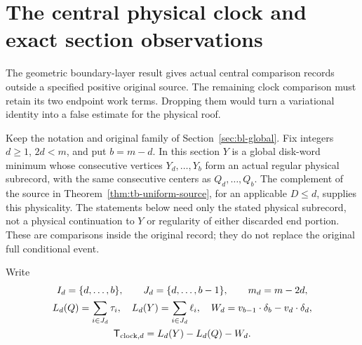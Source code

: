 \section{The central physical clock and exact section observations}
\label{sec:cp-central}
The geometric boundary-layer result gives actual central comparison
records outside a specified positive original source.  The remaining
clock comparison must retain its two endpoint work terms.  Dropping
them would turn a variational identity into a false estimate for the
physical roof.

Keep the notation and original family of Section~\ref{sec:bl-global}.
Fix integers $d\ge1$, $2d<m$, and put $b=m-d$.  In this section
$Y$ is a global disk-word minimum whose consecutive vertices
$Y_d,\ldots,Y_b$ form an actual regular physical subrecord, with the
same consecutive centers as $Q_d,\ldots,Q_b$.  The complement of the
source in Theorem~\ref{thm:tb-uniform-source}, for an applicable
$D\le d$, supplies this physicality.  The statements below need only
the stated physical subrecord, not a physical continuation to $Y$ or
regularity of either discarded end portion.  These are comparisons
inside the original record; they do not replace the original full
conditional event.

Write
\begin{equation}\label{eq:cp-central-objects}
 \begin{gathered}
 I_d=\{d,\ldots,b\},\qquad J_d=\{d,\ldots,b-1\},\qquad m_d=m-2d,\\
 L_d(Q)=\sum_{i\in J_d}\tau_i,\quad
 L_d(Y)=\sum_{i\in J_d}\ell_i,\quad
 W_d=v_{b-1}\cdot\delta_b-v_d\cdot\delta_d,\\
 \mathsf T_{{\rm clock},d}=L_d(Y)-L_d(Q)-W_d .
 \end{gathered}
\end{equation}

